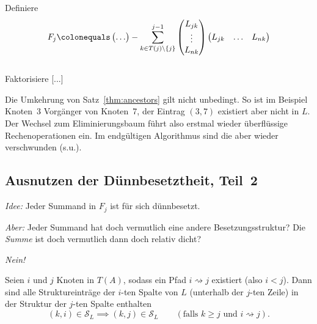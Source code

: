 \begin{algorithm}[H]
 \SetAlgoLined

 {
  Definiere
 \begin{equation*}
  F_j
  \colonequals
  \begin{pmatrix}
   \dots
  \end{pmatrix}
  -
  \sum_{k \in T(j) \setminus \{j\}}^{j-1}
  \begin{pmatrix}
   L_{jk} \\
   \vdots \\
   L_{nk}
  \end{pmatrix}
  \begin{pmatrix}
   L_{jk} & \ldots & L_{nk}
  \end{pmatrix}
  \end{equation*}
  \\
 Faktorisiere [...]
 }
\end{algorithm}


Die Umkehrung von Satz~\ref{thm:ancestors} gilt nicht unbedingt. So ist im Beispiel
Knoten~3 Vorgänger von Knoten~7, der Eintrag $(3,7)$ existiert aber nicht in $L$.
Der Wechsel zum Eliminierungsbaum führt also erstmal wieder überflüssige Rechenoperationen
ein.  Im endgültigen Algorithmus sind die aber wieder verschwunden (s.u.).

\subsection{Ausnutzen der Dünnbesetztheit, Teil~2}

\emph{Idee:} Jeder Summand in $F_j$ ist für sich dünnbesetzt.

\medskip

\emph{Aber:} Jeder Summand hat doch vermutlich eine andere Besetzungsstruktur?
 Die \emph{Summe} ist doch vermutlich dann doch relativ dicht?

\medskip

\emph{Nein!}

\begin{satz}
\label{thm:column_structure_inclusion}
Seien $i$ und $j$ Knoten in $T(A)$, sodass ein Pfad $i \rightsquigarrow j$ existiert (also $i<j$).
Dann sind alle Struktureinträge der $i$-ten Spalte von $L$ (unterhalb der $j$-ten Zeile) in der
Struktur der $j$-ten Spalte enthalten
\begin{equation*}
 (k,i) \in \mathcal{S}_L
 \implies
 (k,j) \in \mathcal{S}_L \qquad (\text{falls $k \geq j$ und $i \rightsquigarrow j$}).
\end{equation*}
\end{satz}

